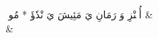 
\textfarsi{أُتٖنْزِ وَ رَمَانِ يَ مَئِيشَ يَ نْدٗؤَ * مُومٖ} & \textfarsi{ }\\
\nopagebreak {} & \\
[12mm]

% 
% 
% 
